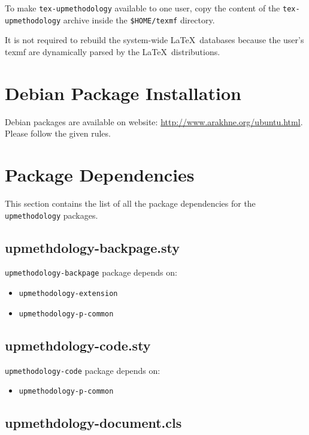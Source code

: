 \documentclass[book]{upmethodology-document}
\begin{document}
To make \texttt{tex-upmethodology} available to one user, copy the content of the \texttt{tex-upmethodology} archive inside the \texttt{\$HOME/texmf} directory.

It is not required to rebuild the system-wide \LaTeX\ databases because the user's texmf are dynamically parsed by the \LaTeX\ distributions.

\section{Debian Package Installation}

Debian packages are available on \arakhneorg website: \url{http://www.arakhne.org/ubuntu.html}. Please follow the given rules.

\section{Package Dependencies}

This section contains the list of all the package dependencies for the \texttt{upmethodology} packages.

\subsection{upmethdology-backpage.sty}

\texttt{upmethodology-backpage} package depends on:
\begin{itemize}
\item \texttt{upmethodology-extension}
\item \texttt{upmethodology-p-common}
\end{itemize}

\subsection{upmethdology-code.sty}

\texttt{upmethodology-code} package depends on:
\begin{itemize}
\item \texttt{upmethodology-p-common}
\end{itemize}

\subsection{upmethdology-document.cls}
\end{document}
